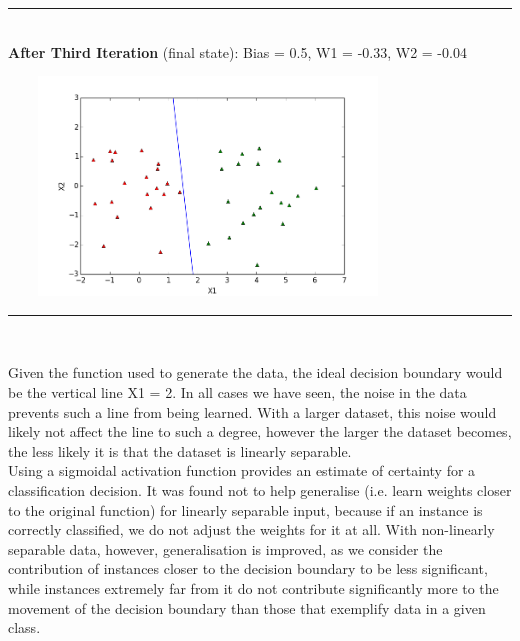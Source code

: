 \documentclass{article}
\begin{document}
\begin{center}
\vspace{2mm}
\rule{8cm}{0.4pt} \\
\vspace{2mm}
\textbf{After Third Iteration} (final state): Bias = 0.5, W1 = -0.33, W2 = -0.04 \\
\centerline{\includegraphics[width=400px, height=220px]{partA2_iter3}}
\vspace{2mm}
\rule{8cm}{0.4pt} \\
\vspace{2mm}
\end{center}

\noindent Given the function used to generate the data, the ideal decision boundary would be the vertical line X1 = 2. In all cases we have seen, the noise in the data prevents such a line from being learned. With a larger dataset, this noise would likely not affect the line to such a degree, however the larger the dataset becomes, the less likely it is that the dataset is linearly separable. \\
\indent Using a sigmoidal activation function provides an estimate of certainty for a classification decision. It was found not to help generalise (i.e. learn weights closer to the original function) for linearly separable input, because if an instance is correctly classified, we do not adjust the weights for it at all. With non-linearly separable data, however, generalisation is improved, as we consider the contribution of instances closer to the decision boundary to be less significant, while instances extremely far from it do not contribute significantly more to the movement of the decision boundary than those that exemplify data in a given class.
\end{document}
